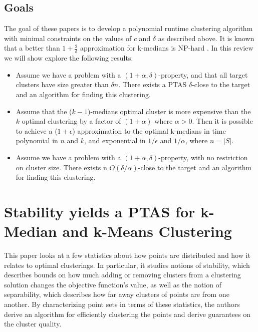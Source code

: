 \documentclass[paper=a4, fontsize=10.5pt]{scrartcl} %
\numberwithin{equation}{section} %
\numberwithin{figure}{section} %
\numberwithin{table}{section} %
\begin{document}
\subsection{Goals}

The goal of these papers is to develop a polynomial runtime clustering algorithm with minimal constraints on the values of $c$ and $\delta$ as described above. It is known that a better than $1 + \frac{2}{\delta}$ approximation for k-medians is NP-hard \cite{JMS02}. In this review we will show explore the following results:

\begin{itemize}

\item Assume we have a problem with a $(1+\alpha, \delta)$-property, and that all target clusters have size greater than $\delta n$. There exists a PTAS $\delta$-close to the target and an algorithm for finding this clustering.

\item Assume that the ($k-1$)-medians optimal cluster is more expensive than the $k$ optimal clustering by a factor of $(1+\alpha)$ where $\alpha > 0$. Then it is possible to achieve a ($1+\epsilon$) approximation to the optimal k-medians in time polynomial in $n$ and $k$, and exponential in $1/\epsilon$ and $1/\alpha$, where $n = |S|$.

\item Assume we have a problem with a $(1+\alpha, \delta)$-property, with no restriction on cluster size. There exists n $O(\delta/\alpha)$-close to the target and an algorithm for finding this clustering.
\end{itemize}


\section{Stability yields a PTAS for k-Median and k-Means Clustering}

This paper looks at a few statistics about how points are distributed and how it relates to optimal clusterings.  In particular, it studies notions of stability, which describes bounds on how much adding or removing clusters from a clustering solution changes the objective function's value, as well as the notion of separability, which describes how far away clusters of points are from one another.  By characterizing point sets in terms of these statistics, the authors derive an algorithm for efficiently clustering the points and derive guarantees on the cluster quality.
\end{document}
